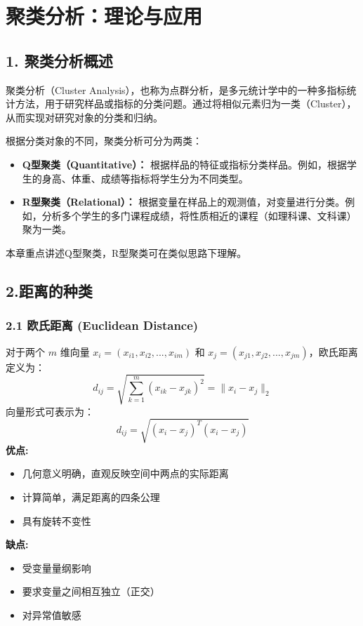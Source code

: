 \section{聚类分析：理论与应用}

\subsection{1. 聚类分析概述}
聚类分析（Cluster Analysis），也称为点群分析，是多元统计学中的一种多指标统计方法，用于研究样品或指标的分类问题。通过将相似元素归为一类（Cluster），从而实现对研究对象的分类和归纳。

根据分类对象的不同，聚类分析可分为两类：
\begin{itemize}
    \item \textbf{Q型聚类（Quantitative）：} 根据样品的特征或指标分类样品。例如，根据学生的身高、体重、成绩等指标将学生分为不同类型。
    \item \textbf{R型聚类（Relational）：} 根据变量在样品上的观测值，对变量进行分类。例如，分析多个学生的多门课程成绩，将性质相近的课程（如理科课、文科课）聚为一类。
\end{itemize}
本章重点讲述Q型聚类，R型聚类可在类似思路下理解。

\subsection{2.距离的种类}

\subsubsection{2.1 欧氏距离 (Euclidean Distance)}
对于两个 $m$ 维向量 $x_i = (x_{i1}, x_{i2}, ..., x_{im})$ 和 $x_j = (x_{j1}, x_{j2}, ..., x_{jm})$，欧氏距离定义为：
\[
d_{ij} = \sqrt{\sum_{k=1}^m (x_{ik} - x_{jk})^2} = \|x_i - x_j\|_2
\]
\noindent
向量形式可表示为：
\[
d_{ij} = \sqrt{(x_i - x_j)^T(x_i - x_j)}
\]
\textbf{优点:} 
\begin{itemize}
    \item 几何意义明确，直观反映空间中两点的实际距离
    \item 计算简单，满足距离的四条公理
    \item 具有旋转不变性
\end{itemize}
\textbf{缺点:} 
\begin{itemize}
    \item 受变量量纲影响
    \item 要求变量之间相互独立（正交）
    \item 对异常值敏感
\end{itemize}

